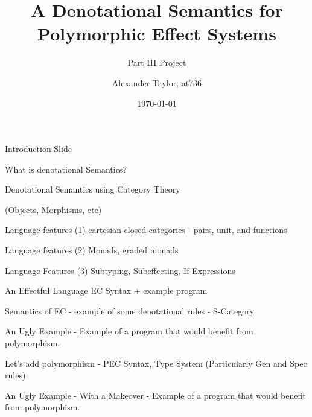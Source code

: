 \documentclass{beamer}
\title{A Denotational Semantics for Polymorphic Effect Systems}
\subtitle{Part III Project}
\author{Alexander Taylor, at736}
\institute{University of Cambridge}
\date{\today}
\begin{document}
\begin{frame}
    \titlepage
\end{frame}

\begin{frame}{Introduction Slide}    
\end{frame}

\begin{frame}{What is denotational Semantics? }
       
\end{frame}

\begin{frame}{Denotational Semantics using Category Theory}
    

    (Objects, Morphisms, etc)
\end{frame}

\begin{frame}{Language features (1)}
        cartesian closed categories - pairs, unit, and functions
\end{frame}

\begin{frame}{Language features (2)}
        Monads, graded monads    
\end{frame}

\begin{frame}{Language Features (3)}
    Subtyping, Subeffecting, If-Expressions
\end{frame}

\begin{frame}{An Effectful Language}
    EC Syntax + example program    
\end{frame}

\begin{frame}{Semantics of EC}
    - example of some denotational rules
    - S-Category
\end{frame}

\begin{frame}{An Ugly Example}
    - Example of a program that would benefit from polymorphism.    
\end{frame}

\begin{frame}{Let's add polymorphism}
    - PEC Syntax, Type System (Particularly Gen and Spec rules)
\end{frame}

\begin{frame}{An Ugly Example - With a Makeover}
- Example of a program that would benefit from polymorphism.  
\end{frame}
\end{document}
